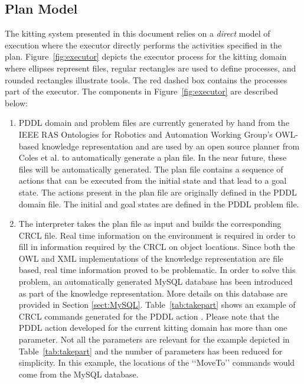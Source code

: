 \subsection{Plan Model}
The kitting system presented in this document relies on a \textit{direct} model of execution where the executor directly performs the activities specified in the plan. Figure~\ref{fig:executor} depicts the executor process for the kitting domain where ellipses represent files, regular rectangles are used to define processes, and rounded rectangles illustrate tools. The red dashed box contains the processes part of the executor. The components in Figure~\ref{fig:executor} are described below:

\begin{enumerate}
\item PDDL domain and problem files are currently generated by hand from the IEEE RAS  Ontologies for Robotics and Automation Working Group's
OWL-based knowledge representation
and are used by an open source planner from Coles et al. \cite{Coles.ICAPS.2010} to automatically generate a plan file. In the near future, these files will be automatically generated.
The plan file contains a sequence of actions that can be executed from the initial state and that lead to a goal state. The actions present in the plan file are originally defined in the PDDL domain file. The initial and goal states are defined in the PDDL problem file.

\item The interpreter takes the plan file as input and builds the corresponding CRCL file. Real time information on the environment is required in order to fill in information required by the CRCL on
object locations. Since both the OWL and XML implementations of the knowledge representation are file based, real time information proved to be problematic. In order to solve this problem,
an automatically generated MySQL database \cite{MySQL} has been introduced as part of the knowledge representation. More details on this database are provided in Section \ref{sect:MySQL}.
Table~\ref{tab:takepart} shows an example of CRCL commands generated for the PDDL action . Please note that the PDDL action  developed for the current kitting domain has more than one parameter. Not all the parameters are relevant for the example depicted in Table~\ref{tab:takepart} and the number of parameters has been  reduced for simplicity. In this example,
the locations of the \lq\lq{}MoveTo\rq\rq{} commands would come from the MySQL database.


\end{enumerate}
